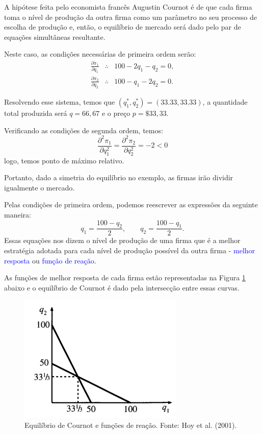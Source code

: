 \documentclass[preprintnumbers,nofootinbib,amsmath,amssymb,12pt]{article}
\begin{document}
A hipótese feita pelo economista francês Augustin Cournot é de que cada firma toma o nível de produção da outra firma como um parâmetro no seu processo de escolha de produção e, então, o equilíbrio de mercado será dado pelo par de equações simultâneas resultante.

Neste caso, as condições necessárias de primeira ordem serão:
\begin{eqnarray}
\frac{\partial \pi_1}{\partial q_1}&\therefore& 100 - 2q_1 - q_2 = 0, \nonumber \\
\frac{\partial \pi_2}{\partial q_2}&\therefore& 100 - q_1 - 2q_2 = 0. \nonumber
\end{eqnarray}

Resolvendo esse sistema, temos que $(q_1^*, q_2^*) = (33.33, 33.33)$, a quantidade total produzida será $q = 66,67$ e o preço $p = \$33,33$.

Verificando as condições de segunda ordem, temos:
\[
\frac{\partial^2 \pi_1}{\partial q_1^2} = \frac{\partial^2 \pi_2}{\partial q_2^2} = -2 < 0
\]
logo, temos ponto de máximo relativo.

Portanto, dado a simetria do equilíbrio no exemplo, as firmas irão dividir igualmente o mercado.

Pelas condições de primeira ordem, podemos reescrever as expressões da seguinte maneira:
\[
q_1 = \frac{100-q_2}{2}, \qquad q_2 = \frac{100-q_1}{2}.
\]
Essas equações nos dizem o nível de produção de uma firma que é a melhor estratégia adotada para cada nível de produção possível da outra firma - \textcolor{blue}{melhor resposta} ou \textcolor{blue}{função de reação}.

As funções de melhor resposta de cada firma estão representadas na Figura \ref{fig1} abaixo e o equilíbrio de Cournot é dado pela intersecção entre essas curvas.

\begin{figure}[h!]
    \centering
    \includegraphics[width=0.7\textwidth]{./figures/aula6_fig1.PNG}
    \caption{Equilíbrio de Cournot e funções de reação. Fonte: Hoy et al. (2001).}
    \label{fig1}
\end{figure}
\end{document}
